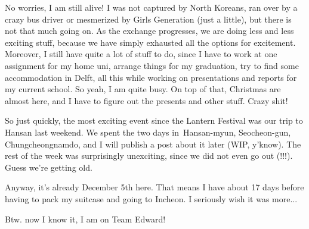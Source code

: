 \begin{post}
	\begin{content}
No worries, I am still alive! I was not captured by North Koreans, ran over by a crazy bus driver or mesmerized by Girls Generation (just a little), but there is not that much going on. As the exchange progresses, we are doing less and less exciting stuff, because we have simply exhausted all the options for excitement. Moreover, I still have quite a lot of stuff to do, since I have to work at one assignment for my home uni, arrange things for my graduation, try to find some accommodation in Delft, all this while working on presentations and reports for my current school. So yeah, I am quite busy. On top of that, Christmas are almost here, and I have to figure out the presents and other stuff. Crazy shit!

So just quickly, the most exciting event since the Lantern Festival was our trip to Hansan last weekend. We spent the two days in Hansan-myun, Seocheon-gun, Chungcheongnamdo, and I will publish a post about it later (WIP, y'know). The rest of the week was surprisingly unexciting, since we did not even go out (!!!). Guess we're getting old.

Anyway, it's already December 5th here. That means I have about 17 days before having to pack my suitcase and going to Incheon. I seriously wish it was more...

Btw. now I know it, I am on Team Edward!
	\end{content}
\end{post}
